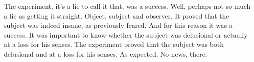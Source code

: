 

The experiment, it's a lie to call it that, was a success.  Well, perhaps not
so much a lie as getting it straight.  Object, subject and observer.  It proved that
the subject was indeed insane, as previously feared.  And for this reason it was
a success.  It was important to know whether the subject was delusional or actually
at a loss for his senses.  The experiment proved that the subject was both delusional
and at a loss for his senses.  As expected.  No news, there.

\bye
